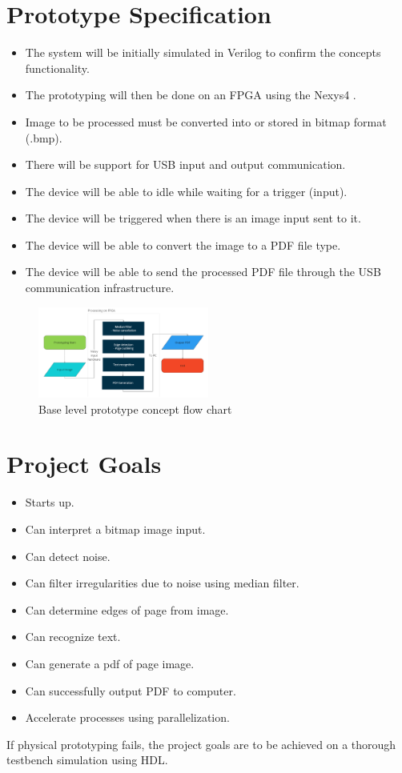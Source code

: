 \documentclass{article}
\begin{document}
\section*{Prototype Specification}
\begin{itemize}
    \item The system will be initially simulated in Verilog to confirm the concepts functionality. 
    \item The prototyping will then be done on an FPGA using the Nexys4 \cite{digilentN4}. 
    \item Image to be processed must be converted into or stored in bitmap format (.bmp). 
    \item There will be support for USB input and output communication. 
    \item The device will be able to idle while waiting for a trigger (input).  
    \item The device will be triggered when there is an image input sent to it.
    \item The device will be able to convert the image to a PDF file type.
    \item The device will be able to send the processed PDF file through the USB communication infrastructure.
\end{itemize}

\begin{figure}[H]
    \centering
    \includegraphics[width=0.5\textwidth]{Images/Prototype_Concept_Flow_Chart.png}
    \caption{Base level prototype concept flow chart}
    \label{fig:Figure 3}
\end{figure}

\section*{Project Goals}
\begin{itemize}
    \item Starts up. 
    \item Can interpret a bitmap image input. 
    \item Can detect noise. 
    \item Can filter irregularities due to noise using median filter. 
    \item Can determine edges of page from image. 
    \item Can recognize text. 
    \item Can generate a pdf of page image. 
    \item Can successfully output PDF to computer. 
    \item Accelerate processes using parallelization. 
\end{itemize}
If physical prototyping fails, the project goals are to be achieved on a thorough testbench simulation using HDL. 



\end{document}
